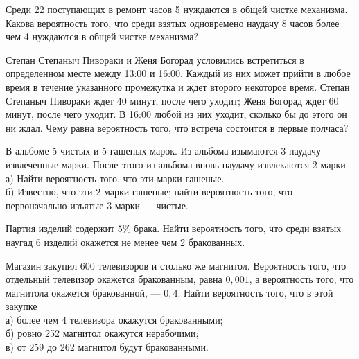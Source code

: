 \newpage\setcounter{zad}{0}



\begin{zkrW}{20}\noindent 
	Среди 22 поступающих в ремонт часов 5 нуждаются в общей чистке механизма. Какова вероятность того, что среди взятых одновремено наудачу 8 часов более чем 4 нуждаются в общей чистке механизма?
 
\end{zkrW}

\begin{zkrW}{20}\noindent 
	Степан Степаныч Пивораки и Женя Богорад условились встретиться в определенном месте между 13:00 и 16:00. Каждый из них может прийти в любое время в течение указанного промежутка и ждет второго некоторое время. Степан Степаныч Пивораки ждет 40 минут, после чего уходит; Женя Богорад ждет 60 минут, после чего уходит. В 16:00 любой из них уходит, сколько бы до этого он ни ждал. Чему равна вероятность того, что встреча состоится в первые полчаса?
 
\end{zkrW}

\begin{zkrW}{20}\noindent 
	В альбоме 5 чистых и 5 гашеных марок. Из альбома изымаются 3 наудачу извлеченные марки. После этого из альбома вновь наудачу извлекаются 2 марки. \\ \indent а) Найти вероятность того, что эти марки гашеные. \\ \indent б) Известно, что эти 2 марки гашеные; найти вероятность того, что первоначально изъятые 3 марки --- чистые.
 
\end{zkrW}

\begin{zkrW}{20}\noindent 
	Партия изделий содержит $5\%$ брака. Найти вероятность того, что среди взятых наугад 6 изделий окажется не менее чем 2 бракованных.
 
\end{zkrW}

\begin{zkrW}{20}\noindent 
	Магазин закупил 600 телевизоров и столько же магнитол. Вероятность того, что отдельный телевизор окажется бракованным, равна $0{,}001$, а вероятность того, что магнитола окажется бракованной, --- $0{,}4$. Найти вероятность того, что в этой закупке \\ \indent а) более чем 4 телевизора окажутся бракованными; \\ \indent б) ровно 252 магнитол окажутся нерабочими; \\ \indent в) от 259 до 262 магнитол будут бракованными.
 
\end{zkrW}

